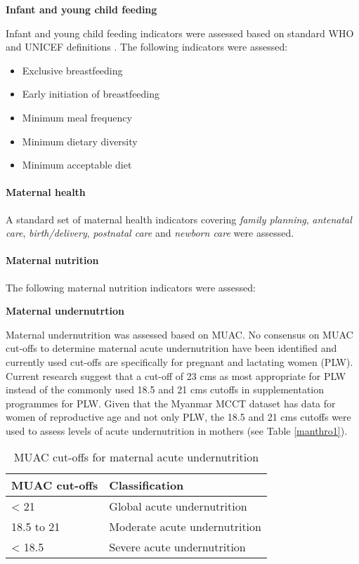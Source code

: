 \documentclass[12pt,a4paper]{article}
\let\oldparagraph\paragraph
\renewcommand{\paragraph}[1]{\oldparagraph{#1}\mbox{}}
\begin{document}
\textbf{Infant and young child feeding}

Infant and young child feeding indicators were assessed based on standard WHO and UNICEF definitions \citep{WorldHealthOrganization:2008vw}. The following indicators were assessed:

\begin{itemize}
\item
  Exclusive breastfeeding
\item
  Early initiation of breastfeeding
\item
  Minimum meal frequency
\item
  Minimum dietary diversity
\item
  Minimum acceptable diet
\end{itemize}

\hypertarget{mhealth}{%
\paragraph{Maternal health}\label{mhealth}}

A standard set of maternal health indicators covering \emph{family planning}, \emph{antenatal care}, \emph{birth/delivery}, \emph{postnatal care} and \emph{newborn care} were assessed.

\hypertarget{mnut}{%
\paragraph{Maternal nutrition}\label{mnut}}

The following maternal nutrition indicators were assessed:

\textbf{Maternal undernutrtion}

Maternal undernutrition was assessed based on MUAC. No consensus on MUAC cut-offs to determine maternal acute undernutrition have been identified and currently used cut-offs are specifically for pregnant and lactating women (PLW). Current research suggest that a cut-off of 23 cms as most appropriate for PLW \citep{Ververs:2013ee} instead of the commonly used 18.5 and 21 cms cutoffs in supplementation programmes for PLW. Given that the Myanmar MCCT dataset has data for women of reproductive age and not only PLW, the 18.5 and 21 cms cutoffs were used to assess levels of acute undernutrition in mothers (see Table \ref{manthro1}).

\begin{table}[H]

\caption{\label{tab:manthro1}MUAC cut-offs for maternal acute undernutrition}
\centering
\begin{tabular}[t]{ll}
\toprule
\textbf{MUAC cut-offs} & \textbf{Classification}\\
\midrule
\rowcolor{gray!6}  < 21 & Global acute undernutrition\\
18.5 to 21 & Moderate acute undernutrition\\
\rowcolor{gray!6}  < 18.5 & Severe acute undernutrition\\
\bottomrule
\end{tabular}
\end{table}
\end{document}
